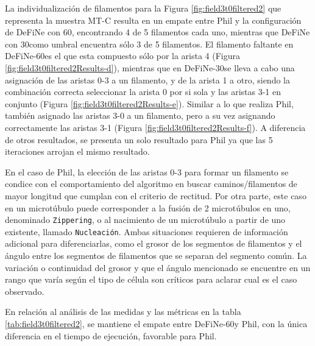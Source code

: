 
La individualizaci\'on de filamentos para la Figura \ref{fig:field3t0filtered2} que representa la muestra MT-C resulta en un empate entre Phil y la configuraci\'on de DeFiNe con 60\textdegree, encontrando 4 de 5 filamentos cada uno, mientras que DeFiNe con 30\textdegree como umbral encuentra s\'olo 3 de 5 filamentos. El filamento faltante en DeFiNe-60\textdegree es el que esta compuesto s\'olo por la arista 4 (Figura \ref{fig:field3t0filtered2Results-d}), mientras que en DeFiNe-30\textdegree se lleva a cabo una asignaci\'on de las aristas 0-3 a un filamento, y de la arista 1 a otro, siendo la combinaci\'on correcta seleccionar la arista 0 por si sola y las aristas 3-1 en conjunto (Figura \ref{fig:field3t0filtered2Results-e}). Similar a lo que realiza Phil, tambi\'en asignado las aristas 3-0 a un filamento, pero a su vez asignando correctamente las aristas 3-1 (Figura \ref{fig:field3t0filtered2Results-f}).  A diferencia de otros resultados, se presenta un solo resultado para Phil ya que las 5 iteraciones arrojan el mismo resultado.


En el caso de Phil, la elecci\'on de las aristas 0-3 para formar un filamento se condice con el comportamiento del algoritmo en buscar caminos/filamentos de mayor longitud que cumplan con el criterio de rectitud. Por otra parte, este caso en un microt\'ubulo puede corresponder a la fusi\'on de 2 microt\'ubulos en uno, denominado {\tt Zippering}, o al nacimiento de un microt\'ubulo a partir de uno existente, llamado {\tt Nucleaci\'on}. Ambas situaciones requieren de informaci\'on adicional para diferenciarlas, como el grosor de los segmentos de filamentos y el \'angulo entre los segmentos de filamentos que se separan del segmento com\'un. La variaci\'on o continuidad del grosor y que el \'angulo mencionado se encuentre en un rango que var\'ia seg\'un el tipo de c\'elula son cr\'iticos para aclarar cual es el caso observado. 

En relaci\'on al an\'alisis de las medidas y las m\'etricas en la tabla \ref{tab:field3t0filtered2}, se mantiene el empate entre DeFiNe-60\textdegree y Phil, con la \'unica diferencia en el tiempo de ejecuci\'on, favorable para Phil. 

